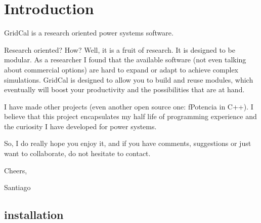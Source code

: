 \documentclass[11pt,fleqn]{book} %
\begin{document}

\pagestyle{empty} %

\renewcommand\contentsname{Table of content}
\tableofcontents%


\pagestyle{fancy} %



\chapter{Introduction}

GridCal is a research oriented power systems software.  \newline

Research oriented? How? Well, it is a fruit of research. It is designed to be modular. As a researcher I found that the available software (not even talking about commercial options) are hard to expand or adapt to achieve complex simulations. GridCal is designed to allow you to build and reuse modules, which eventually will boost your productivity and the possibilities that are at hand. \newline

I have made other projects (even another open source one: fPotencia in C++). I believe that this project encapsulates my half life of programming experience and the curiosity I have developed for power systems. \newline

So, I do really hope you enjoy it, and if you have comments, suggestions or just want to collaborate, do not hesitate to contact.\newline

\begin{flushright}
	Cheers, 

Santiago
\end{flushright}

\newpage
\section{installation}
\end{document}
